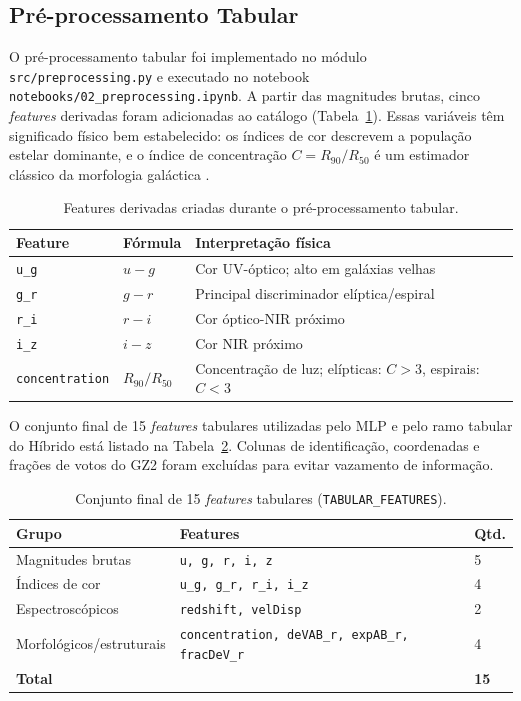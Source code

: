 \documentclass[12pt, a4paper]{article}
\begin{document}
\subsection{Pré-processamento Tabular}

O pré-processamento tabular foi implementado no módulo
\texttt{src/preprocessing.py} e executado no notebook
\texttt{notebooks/02\_preprocessing.ipynb}. A partir das magnitudes brutas,
cinco \textit{features} derivadas foram adicionadas ao catálogo
(Tabela~\ref{tab:features_derivadas}). Essas variáveis têm significado
físico bem estabelecido: os índices de cor descrevem a população estelar
dominante, e o índice de concentração $C = R_{90}/R_{50}$ é um estimador
clássico da morfologia galáctica \cite{conselice2003}.

\begin{table}[H]
  \centering
  \caption{Features derivadas criadas durante o pré-processamento tabular.}
  \label{tab:features_derivadas}
  \begin{tabular}{llp{7cm}}
    \toprule
    \textbf{Feature} & \textbf{Fórmula} & \textbf{Interpretação física} \\
    \midrule
    \texttt{u\_g} & $u - g$ & Cor UV-óptico; alto em galáxias velhas \\
    \texttt{g\_r} & $g - r$ & Principal discriminador elíptica/espiral \\
    \texttt{r\_i} & $r - i$ & Cor óptico-NIR próximo \\
    \texttt{i\_z} & $i - z$ & Cor NIR próximo \\
    \texttt{concentration} & $R_{90}/R_{50}$ & Concentração de luz; elípticas: $C > 3$, espirais: $C < 3$ \\
    \bottomrule
  \end{tabular}
\end{table}

O conjunto final de 15 \textit{features} tabulares utilizadas pelo MLP e
pelo ramo tabular do Híbrido está listado na
Tabela~\ref{tab:features_final}. Colunas de identificação, coordenadas e
frações de votos do GZ2 foram excluídas para evitar vazamento de
informação.

\begin{table}[H]
  \centering
  \caption{Conjunto final de 15 \textit{features} tabulares (\texttt{TABULAR\_FEATURES}).}
  \label{tab:features_final}
  \begin{tabular}{lll}
    \toprule
    \textbf{Grupo} & \textbf{Features} & \textbf{Qtd.} \\
    \midrule
    Magnitudes brutas    & \texttt{u, g, r, i, z}                          & 5 \\
    Índices de cor       & \texttt{u\_g, g\_r, r\_i, i\_z}                 & 4 \\
    Espectroscópicos     & \texttt{redshift, velDisp}                       & 2 \\
    Morfológicos/estruturais & \texttt{concentration, deVAB\_r, expAB\_r, fracDeV\_r} & 4 \\
    \midrule
    \textbf{Total} & & \textbf{15} \\
    \bottomrule
  \end{tabular}
\end{table}
\end{document}
